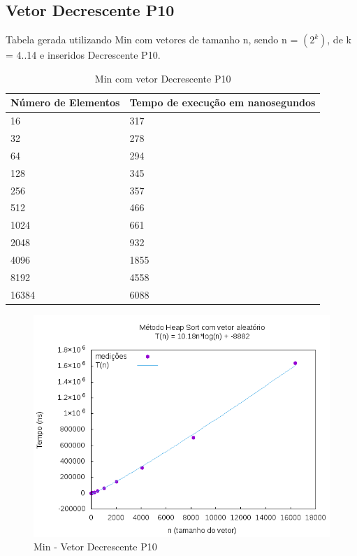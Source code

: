 \documentclass[12pt,a4paper,twoside]{report}
\begin{document}
\subsection{Vetor Decrescente P10}
Tabela gerada utilizando Min com vetores de tamanho n, sendo n = $(2^k)$, de k = 4..14 e inseridos Decrescente P10.
\begin{table}[H]
\centering
\caption{Min com vetor Decrescente P10}
\label{my-label}
\begin{tabular}{|l|l|}
\hline
\multicolumn{1}{|c|}{\textbf{Número de Elementos}} & \multicolumn{1}{c|}{\textbf{Tempo de execução em nanosegundos}} \\ \hline
16 & 317 \\ \hline
32 & 278 \\ \hline
64 & 294 \\ \hline
128 & 345 \\ \hline
256 & 357 \\ \hline
512 & 466 \\ \hline
1024 & 661 \\ \hline
2048 & 932 \\ \hline
4096 & 1855 \\ \hline
8192 & 4558 \\ \hline
16384 & 6088 \\ \hline

\end{tabular}
\end{table}

\begin{figure}[H]
    \centering
    \includegraphics[width=0.7\linewidth]{graficos/HeapSort/vIntAleatorio/vIntAleatorio.png}
  \caption{Min - Vetor Decrescente P10}
\end{figure}
\end{document}

